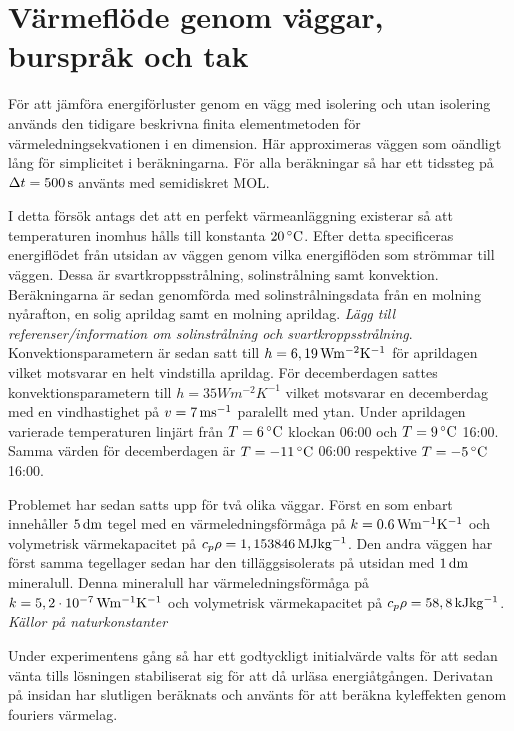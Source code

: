\section{Värmeflöde genom väggar, burspråk och tak}

För att jämföra energiförluster genom en vägg med isolering och utan isolering används
den tidigare beskrivna finita elementmetoden för värmeledningsekvationen i en dimension. Här approximeras
väggen som oändligt lång för simplicitet i beräkningarna. För alla beräkningar så har ett tidssteg
på $\Delta t = \unit[500]{s}$ använts med semidiskret MOL.

I detta försök antags det att en perfekt värmeanläggning
existerar så att temperaturen inomhus hålls till konstanta $\unit[20]{^\circ C}$. Efter detta specificeras energiflödet
från utsidan av väggen genom vilka energiflöden som strömmar till väggen. Dessa är svartkroppsstrålning, solinstrålning
samt konvektion. Beräkningarna är sedan genomförda med solinstrålningsdata från en molning nyårafton,
en solig aprildag samt en molning aprildag.\emph{\color{red} Lägg till referenser/information om solinstrålning och svartkroppsstrålning}.
Konvektionsparametern är sedan satt till $h=\unit[6,19]{Wm^{-2}K^{-1}}$ för aprildagen vilket motsvarar en helt vindstilla aprildag.
För decemberdagen sattes konvektionsparametern till $h=\unit{35}{Wm^{-2}K^{-1}}$ vilket motsvarar en decemberdag med en vindhastighet på $v=\unit[7]{ms^{-1}}$ paralellt
med ytan.
Under aprildagen varierade temperaturen linjärt från $T=\unit[6]{^\circ C}$ klockan 06:00 och $T=\unit[9]{^\circ C}$ 16:00.
Samma värden för decemberdagen är $T = \unit[-11]{^\circ C}$ 06:00 respektive $T=\unit[-5]{^\circ C}$ 16:00.

Problemet har sedan satts upp för två olika väggar. Först en som enbart innehåller $\unit[5]{dm}$ tegel med
en värmeledningsförmåga på $k = \unit[0.6]{Wm^{-1}K^{-1}}$ och volymetrisk värmekapacitet på
$c_{p}\rho = \unit[1,153846]{MJ kg^{-1}}$. Den andra väggen har först samma tegellager sedan
har den tilläggsisolerats på utsidan med $\unit[1]{dm}$ mineralull. Denna mineralull har värmeledningsförmåga på
$k = \unit[5,2\cdot 10^{-7}]{Wm^{-1}K^{-1}}$ och volymetrisk värmekapacitet på
$c_{p}\rho = \unit[58,8]{kJ kg^{-1}}$.
\emph{\color{red} Källor på naturkonstanter}

Under experimentens gång så har ett godtyckligt initialvärde valts för att sedan vänta tills
lösningen stabiliserat sig för att då urläsa energiåtgången. Derivatan på insidan har slutligen beräknats
och använts för att beräkna kyleffekten genom fouriers värmelag.

